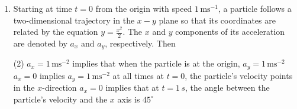 
\begin{enumerate}
    \item Starting at time \( t = 0 \) from the origin with speed \( 1 \, \text{ms}^{-1} \), a particle follows a two-dimensional trajectory in the \( x-y \) plane so that its coordinates are related by the equation \( y = \frac{x^2}{2} \). The \( x \) and \( y \) components of its acceleration are denoted by \( a_x \) and \( a_y \), respectively. Then
        \begin{tasks}(2)
            \task \( a_x = 1 \, \text{ms}^{-2} \) implies that when the particle is at the origin, \( a_y = 1 \, \text{ms}^{-2} \)
            \task \( a_x = 0 \) implies \( a_y = 1 \, \text{ms}^{-2} \) at all times
            \task at \( t = 0 \), the particle’s velocity points in the \( x \)-direction
            \task \( a_x = 0 \) implies that at \( t = 1 \, s \), the angle between the particle’s velocity and the \( x \) axis is \( 45^\circ \)
        \end{tasks}
\end{enumerate}
